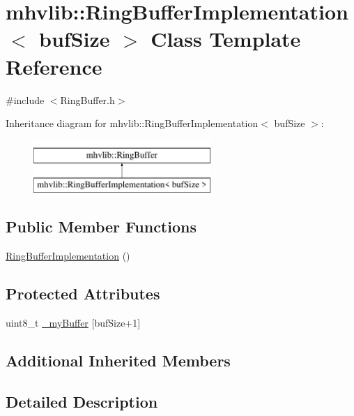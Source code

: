\hypertarget{classmhvlib_1_1_ring_buffer_implementation}{\section{mhvlib\-:\-:Ring\-Buffer\-Implementation$<$ buf\-Size $>$ Class Template Reference}
\label{classmhvlib_1_1_ring_buffer_implementation}
}


{\ttfamily \#include $<$Ring\-Buffer.\-h$>$}

Inheritance diagram for mhvlib\-:\-:Ring\-Buffer\-Implementation$<$ buf\-Size $>$\-:\begin{figure}[H]
\begin{center}
\leavevmode
\includegraphics[height=2.000000cm]{classmhvlib_1_1_ring_buffer_implementation}
\end{center}
\end{figure}
\subsection*{Public Member Functions}
\begin{DoxyCompactItemize}
\item 
\hyperlink{classmhvlib_1_1_ring_buffer_implementation_aa8fa6bfc3f21b39eb74a2e817a5c8991}{Ring\-Buffer\-Implementation} ()
\end{DoxyCompactItemize}
\subsection*{Protected Attributes}
\begin{DoxyCompactItemize}
\item 
uint8\-\_\-t \hyperlink{classmhvlib_1_1_ring_buffer_implementation_ab4c8b5f8fa672d97821db954eaab3117}{\-\_\-my\-Buffer} \mbox{[}buf\-Size+1\mbox{]}
\end{DoxyCompactItemize}
\subsection*{Additional Inherited Members}


\subsection{Detailed Description}
